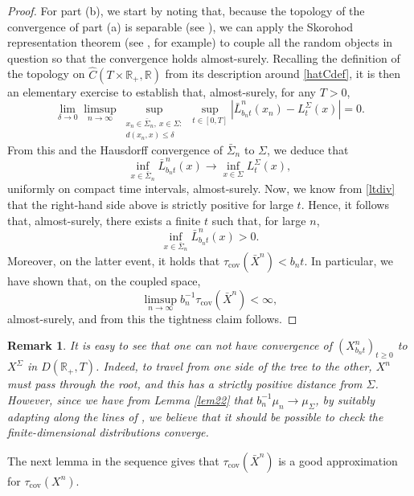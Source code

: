 \documentclass[a4paper, 11pt]{article}
\newtheorem{rem}[theorem]{Remark}
\begin{document}
\begin{proof}
For part (b), we start by noting that, because the topology of the convergence of part (a) is separable (see \cite[Theorem 2.28]{Noda}), we can apply the Skorohod representation theorem (see \cite[Theorem 4.30]{Kall}, for example) to couple all the random objects in question so that the convergence holds almost-surely. Recalling the definition of the topology on $\hat{C}(T\times \mathbb{R}_+,\mathbb{R})$ from its description around \eqref{hatCdef}, it is then an elementary exercise to establish that, almost-surely, for any $T>0$,
\[\lim_{\delta\rightarrow0}\limsup_{n\rightarrow\infty}\sup_{\substack{x_n\in\bar{\Sigma}_n,\:x\in \Sigma:\\d(x_n,x)\leq \delta}}\sup_{t\in[0,T]}\left|\bar{L}^n_{b_nt}(x_n)-L^\Sigma_t(x)\right|=0.\]
From this and the Hausdorff convergence of $\bar{\Sigma}_n$ to $\Sigma$, we deduce that
\[\inf_{x\in\bar{\Sigma}_n}\bar{L}^n_{b_nt}(x)\rightarrow \inf_{x\in \Sigma}L^\Sigma_t(x),\]
uniformly on compact time intervals, almost-surely. Now, we know from \eqref{ltdiv} that the right-hand side above is strictly positive for large $t$. Hence, it follows that, almost-surely, there exists a finite $t$ such that, for large $n$,
\[\inf_{x\in\bar{\Sigma}_n}\bar{L}^n_{b_nt}(x)>0.\]
Moreover, on the latter event, it holds that $\tau_{\mathrm{cov}}(\bar{X}^n)<b_nt$. In particular, we have shown that, on the coupled space,
\[\limsup_{n\rightarrow\infty }b_n^{-1}\tau_{\mathrm{cov}}(\bar{X}^n)<\infty,\]
almost-surely, and from this the tightness claim follows.
\end{proof}

\begin{rem}\label{rem42}
It is easy to see that one can not have convergence of $(X^n_{b_nt})_{t\geq0}$ to $X^\Sigma$ in $D(\mathbb{R}_+,T)$. Indeed, to travel from one side of the tree to the other, $X^n$ must pass through the root, and this has a strictly positive distance from $\Sigma$. However, since we have from Lemma \ref{lem22} that $b_n^{-1}\mu_n\rightarrow\mu_\Sigma$, by suitably adapting \cite{Cr3} along the lines of \cite[Theorem 1(ii)]{ALW}, we believe that it should be possible to check the finite-dimensional distributions converge.
\end{rem}

The next lemma in the sequence gives that $\tau_{\mathrm{cov}}(\bar{X}^n)$ is a good approximation for $\tau_{\mathrm{cov}}({X}^n)$.
\end{document}
